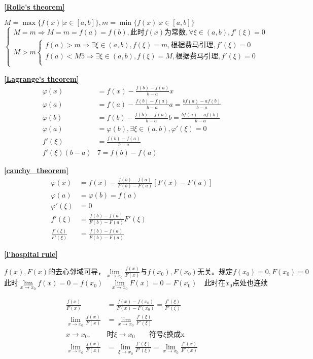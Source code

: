 \textbf{\large \ref{Rolle's theorem}}
\begin{center}
    $M=\max\{f(x)|x\in[a,b]\},m=\min\{f(x)|x\in[a,b]\}$
    $\begin{cases}
        M=m\Rightarrow M=m=f(a)=f(b),\mbox{此时}f(x)\mbox{为常数},\forall \xi \in(a,b),f'(\xi)=0\\
        M>m \begin{cases}
            f(a)>m \Rightarrow \exists \xi \in(a,b),f(\xi)=m,\mbox{根据费马引理},f'(\xi)=0\\
            f(a)<M5 \Rightarrow \exists \xi \in(a,b),f(\xi)=M,\mbox{根据费马引理},f'(\xi)=0\\
        \end{cases}
    \end{cases}$
\end{center}
\textbf{\large \ref{Lagrange's theorem}}
\begin{align*}
        \varphi(x)&=f(x)-\frac{f(b)-f(a)}{b-a}x\\
        \varphi(a)&=f(a)-\frac{f(b)-f(a)}{b-a}a=\frac{bf(a)-af(b)}{b-a}\\
        \varphi(b)&=f(b)-\frac{f(b)-f(a)}{b-a}b=\frac{bf(a)-af(b)}{b-a}\\
        \varphi(a)&=\varphi(b),\exists \xi\in(a,b),\varphi'(\xi)=0\\
        f'(\xi)&=\frac{f(b)-f(a)}{b-a}\\
        f'(\xi)(b-a)&7=f(b)-f(a)
\end{align*}

\textbf{\large \ref{cauchy_theorem}}
\begin{align*}
        \varphi(x)&=f(x)-\frac{f(b)-f(a)}{F(b)-F(a)}\left[F(x)-F(a)\right] \\
        \varphi(a)&=\varphi(b)=f(a)\\
        \varphi'(\xi)&=0\\
        f'(\xi)&=\frac{f(b)-f(a)}{F(b)-F(a)}F'(\xi)\\
        \frac{f'(\xi)}{F'(\xi)}&=\frac{f(b)-f(a)}{F(b)-F(a)}
\end{align*}

\textbf{\large \ref{l'hospital rule}}
    \begin{center}
        $f(x),F(x)\mbox{的去心邻域可导，}\lim\limits_{x\to x_0}\frac{f(x)}{F(x)}\mbox{与}f(x_0),F(x_0)\mbox{无关。规定}f(x_0)=0,F(x_0)=0$\\
$\mbox{此时}\lim\limits_{x\to x_0}f(x)=0=f(x_0)\quad\lim\limits_{x\to x_0}F(x)=0=F(x_0)\quad\mbox{此时在$x_0$点处也连续}$\\
    \end{center}
    \begin{align*}
    \frac{f(x)}{F(x)}&=\frac{f(x)-f(x_0)}{F(x)-F(x_0)}=\frac{f'(\xi)}{F'(\xi)}\\
    \lim\limits_{x\to x_0}\frac{f(x)}{F(x)}&=\lim\limits_{x\to x_0}\frac{f'(\xi)}{F'(\xi)}\\
    x\rightarrow x_0,&\mbox{时}\xi\rightarrow x_0\qquad \mbox{符号$\xi$换成x}\\
    \lim\limits_{x\to x_0}\frac{f(x)}{F(x)}&=\lim\limits_{\xi\to x_0}\frac{f'(\xi)}{F'(\xi)}=\lim\limits_{x\to x_0}\frac{f'(x)}{F'(x)}
    \end{align*}

